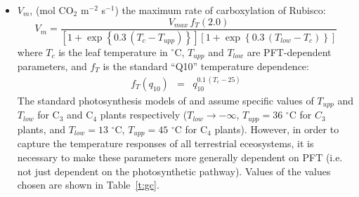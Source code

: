 \documentclass[a4paper]{article}
\begin{document}
\begin{itemize}
\item $V_{m}$, (mol CO$_{2}$ m$^{-2}$ s$^{-1}$) the maximum rate of
carboxylation of Rubisco:
\begin{equation}
V_{m} = \displaystyle{\frac{V_{max} \, f_{T}(2.0)}
{\left[1+\exp \left\{0.3\,(T_{c}-T_{upp}) \right\} \right]
 \left[1+\exp \left\{0.3\,(T_{low}-T_{c}) \right\} \right]}}
\label{e:Vm}
\end{equation}
where $T_{c}$ is the leaf temperature in $^{\circ}$C, $T_{upp}$ and
$T_{low}$ are PFT-dependent parameters, and $f_{T}$ is the standard
``Q10'' temperature dependence:
\begin{eqnarray}
f_{T}(q_{10}) &=& q_{10}^{0.1 \, (T_{c} - 25)}
\end{eqnarray}
The standard photosynthesis models of \citet{Col91} and
\citet{Col92} assume specific values of $T_{upp}$ and $T_{low}$ for
C$_{3}$ and C$_{4}$ plants respectively ($T_{low} \rightarrow
-\infty$, $T_{upp}=36$ $^{\circ}$C for $C_{3}$ plants, and
$T_{low}=13$ $^{\circ}$C, $T_{upp}=45$ $^{\circ}$C for C$_{4}$
plants).  However, in order to capture the temperature responses of
all terrestrial eceosystems, it is necessary to make these parameters
more generally dependent on PFT (i.e. not just dependent on the
photosynthetic pathway). Values of the values chosen are shown in
Table~\ref{t:gc}.


\end{itemize}
\end{document}
